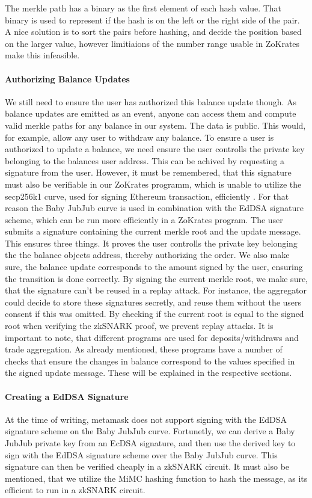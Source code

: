 \documentclass[../../thesis.tex]{subfiles}
\begin{document}
The merkle path has a binary as the first element of each hash value. That binary is used to represent if the hash is on the left or the right side of the pair. A nice solution is to sort the pairs before hashing, and decide the position based on the larger value, however limitiaions of the number range usable in ZoKrates make this infeasible. 

\paragraph{Authorizing Balance Updates}
We still need to ensure the user has authorized this balance update though. As balance updates are emitted as an event, anyone can access them and compute valid merkle paths for any balance in our system. The data is public. This would, for example, allow any user to withdraw any balance. To ensure a user is authorized to update a balance, we need ensure the user controlls the private key belonging to the balances user address. This can be achived by requesting a signature from the user. However, it must be remembered, that this signature must also be verifiable in our ZoKrates programm, which is unable to utilize the secp256k1 curve, used for signing Ethereum transaction, efficiently \cite{deml_2019}. For that reason the Baby JubJub curve is used in combination with the EdDSA signature scheme, which can be run more efficiently in a ZoKrates program. The user submits a signature containing the current merkle root and the update message. This ensures three things. It proves the user controlls the private key belonging the the balance objects address, thereby authorizing the order. We also make sure, the balance update corresponds to the amount signed by the user, ensuring the transition is done correctly. By signing the current merkle root, we make sure, that the signature can't be reused in a replay attack. For instance, the aggregator could decide to store these signatures secretly, and reuse them without the users consent if this was omitted. By checking if the current root is equal to the signed root when verifying the zkSNARK proof, we prevent replay attacks. It is important to note, that different programs are used for deposits/withdraws and trade aggregation. As already mentioned, these programs have a number of checks that ensure the changes in balance correspond to the values specified in the signed update message. These will be explained in the respective sections. 

\paragraph{Creating a EdDSA Signature}
At the time of writing, metamask does not support signing with the EdDSA signature scheme on the Baby JubJub curve. Fortunetly, we can derive a Baby JubJub private key from an EcDSA signature, and then use the derived key to sign with the EdDSA signature scheme over the Baby JubJub curve. This signature can then be verified cheaply in a zkSNARK circuit. It must also be mentioned, that we utilize the MiMC hashing function to hash the message, as its efficient to run in a zkSNARK circuit. 
\end{document}
